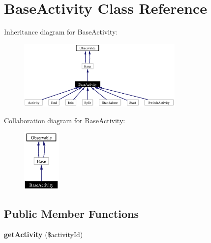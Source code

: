 \section{Base\-Activity Class Reference}
\label{classBaseActivity}
Inheritance diagram for Base\-Activity:\begin{figure}[H]
\begin{center}
\leavevmode
\includegraphics[width=230pt]{classBaseActivity__inherit__graph}
\end{center}
\end{figure}
Collaboration diagram for Base\-Activity:\begin{figure}[H]
\begin{center}
\leavevmode
\includegraphics[width=54pt]{classBaseActivity__coll__graph}
\end{center}
\end{figure}
\subsection*{Public Member Functions}
\begin{CompactItemize}
\item 
{\bf get\-Activity} (\$activity\-Id)
\end{CompactItemize}
